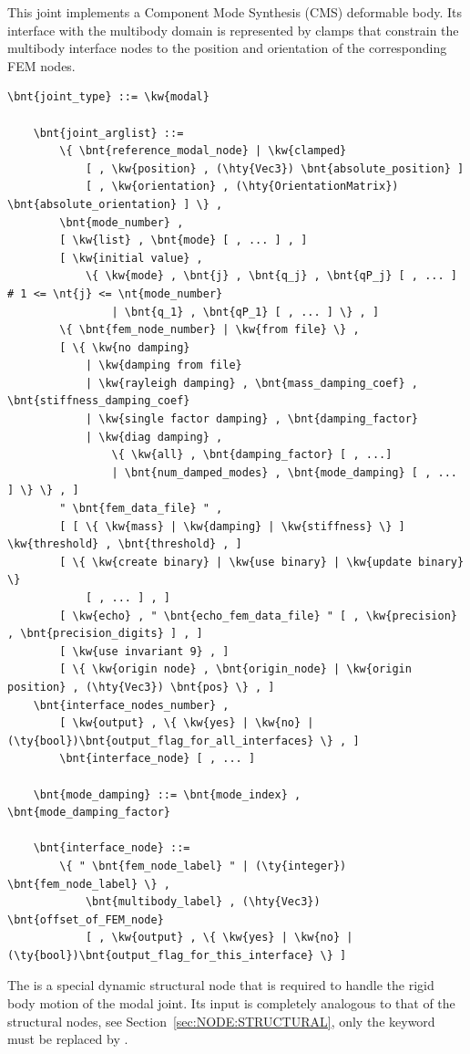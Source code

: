 This joint implements a Component Mode Synthesis (CMS) deformable body.
Its interface with the multibody domain is represented by clamps
that constrain the multibody interface nodes to the position
and orientation of the corresponding FEM nodes.
\begin{Verbatim}[commandchars=\\\{\}]
    \bnt{joint_type} ::= \kw{modal}

    \bnt{joint_arglist} ::=
        \{ \bnt{reference_modal_node} | \kw{clamped}
            [ , \kw{position} , (\hty{Vec3}) \bnt{absolute_position} ]
            [ , \kw{orientation} , (\hty{OrientationMatrix}) \bnt{absolute_orientation} ] \} ,
        \bnt{mode_number} ,
        [ \kw{list} , \bnt{mode} [ , ... ] , ]
        [ \kw{initial value} ,
            \{ \kw{mode} , \bnt{j} , \bnt{q_j} , \bnt{qP_j} [ , ... ]  # 1 <= \nt{j} <= \nt{mode_number}
                | \bnt{q_1} , \bnt{qP_1} [ , ... ] \} , ]
        \{ \bnt{fem_node_number} | \kw{from file} \} ,
        [ \{ \kw{no damping}
            | \kw{damping from file}
            | \kw{rayleigh damping} , \bnt{mass_damping_coef} , \bnt{stiffness_damping_coef}
            | \kw{single factor damping} , \bnt{damping_factor}
            | \kw{diag damping} ,
                \{ \kw{all} , \bnt{damping_factor} [ , ...]
                | \bnt{num_damped_modes} , \bnt{mode_damping} [ , ... ] \} \} , ]
        " \bnt{fem_data_file} " ,
        [ [ \{ \kw{mass} | \kw{damping} | \kw{stiffness} \} ] \kw{threshold} , \bnt{threshold} , ]
        [ \{ \kw{create binary} | \kw{use binary} | \kw{update binary} \}
            [ , ... ] , ]
        [ \kw{echo} , " \bnt{echo_fem_data_file} " [ , \kw{precision} , \bnt{precision_digits} ] , ]
        [ \kw{use invariant 9} , ]
        [ \{ \kw{origin node} , \bnt{origin_node} | \kw{origin position} , (\hty{Vec3}) \bnt{pos} \} , ]
	\bnt{interface_nodes_number} ,
	    [ \kw{output} , \{ \kw{yes} | \kw{no} | (\ty{bool})\bnt{output_flag_for_all_interfaces} \} , ]
	    \bnt{interface_node} [ , ... ]

    \bnt{mode_damping} ::= \bnt{mode_index} , \bnt{mode_damping_factor}

    \bnt{interface_node} ::=
        \{ " \bnt{fem_node_label} " | (\ty{integer}) \bnt{fem_node_label} \} ,
            \bnt{multibody_label} , (\hty{Vec3}) \bnt{offset_of_FEM_node}
	        [ , \kw{output} , \{ \kw{yes} | \kw{no} | (\ty{bool})\bnt{output_flag_for_this_interface} \} ]
\end{Verbatim}
The  is a special dynamic structural node 
that is required to handle the rigid body motion of the modal joint.
Its input is completely analogous to that of the  structural
nodes, see Section~\ref{sec:NODE:STRUCTURAL}, only the keyword  
must be replaced by .

